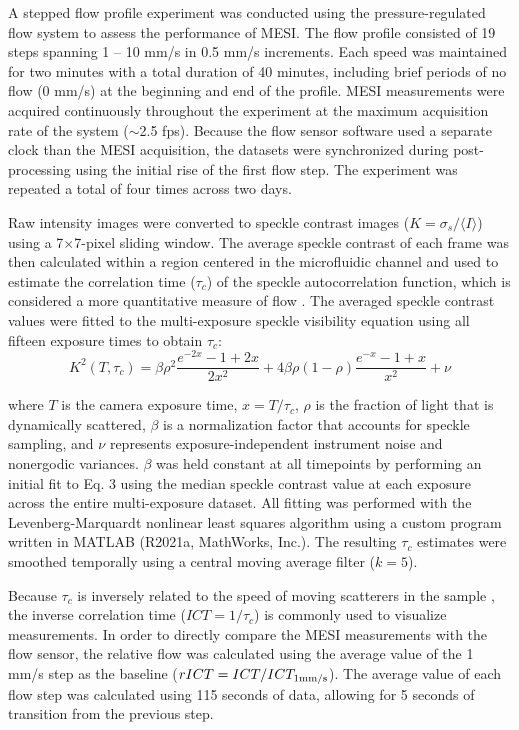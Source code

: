 \documentclass[12pt]{spieman}
\begin{document}
\begin{spacing}{2}
A stepped flow profile experiment was conducted using the pressure-regulated flow system to assess the performance of MESI. The flow profile consisted of 19 steps spanning 1 -- 10 mm/s in 0.5 mm/s increments. Each speed was maintained for two minutes with a total duration of 40 minutes, including brief periods of no flow (0 mm/s) at the beginning and end of the profile. MESI measurements were acquired continuously throughout the experiment at the maximum acquisition rate of the system ($\sim$2.5 fps). Because the flow sensor software used a separate clock than the MESI acquisition, the datasets were synchronized during post-processing using the initial rise of the first flow step. The experiment was repeated a total of four times across two days.

Raw intensity images were converted to speckle contrast images ($K = \sigma_{s} / {\langle{I}\rangle}$) using a 7$\times$7-pixel sliding window. The average speckle contrast of each frame was then calculated within a region centered in the microfluidic channel and used to estimate the correlation time ($\tau_c$) of the speckle autocorrelation function, which is considered a more quantitative measure of flow \cite{Briers:1996kfa}. The averaged speckle contrast values were fitted to the multi-exposure speckle visibility equation \cite{Parthasarathy:2008el} using all fifteen exposure times to obtain $\tau_c$:
%
\begin{equation}
    \label{eq:mesi}
    K^2(T,\tau_c) =
        \beta\rho^2\frac{e^{-2x} - 1 + 2x}{2x^2} +
        4\beta\rho(1 - \rho)\frac{e^{-x} - 1 + x}{x^2} +
        \nu
\end{equation}

\noindent where $T$ is the camera exposure time, $x=T/\tau_c$, $\rho$ is the fraction of light that is dynamically scattered, $\beta$ is a normalization factor that accounts for speckle sampling, and $\nu$ represents exposure-independent instrument noise and nonergodic variances. $\beta$ was held constant at all timepoints by performing an initial fit to Eq. 3 using the median speckle contrast value at each exposure across the entire multi-exposure dataset. All fitting was performed with the Levenberg-Marquardt nonlinear least squares algorithm \cite{Lourakis:J2fCMU5i} using a custom program written in MATLAB (R2021a, MathWorks, Inc.). The resulting $\tau_c$ estimates were smoothed temporally using a central moving average filter ($k=5$).

Because $\tau_c$ is inversely related to the speed of moving scatterers in the sample \cite{Bonner:1981hg}, the inverse correlation time ($ICT = 1/\tau_c$) is commonly used to visualize measurements. In order to directly compare the MESI measurements with the flow sensor, the relative flow was calculated using the average value of the 1 mm/s step as the baseline ($rICT = ICT/ICT_\textnormal{1mm/s}$). The average value of each flow step was calculated using 115 seconds of data, allowing for 5 seconds of transition from the previous step.



\end{spacing}
\end{document}
